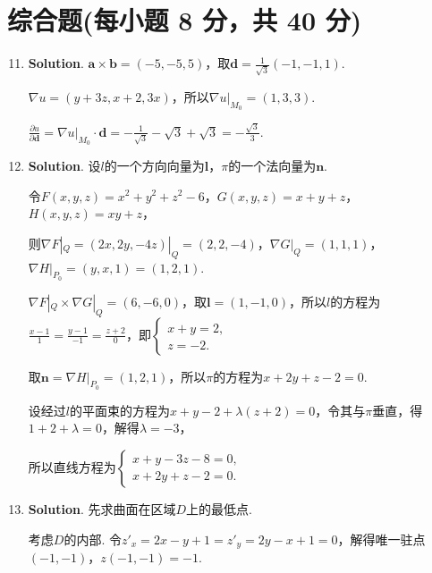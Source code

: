\documentclass[../main.tex]{subfiles}
\begin{document}
\section{综合题(每小题 8 分，共 40 分)}
\begin{enumerate}
    \setcounter{enumi}{10}
    \item \textbf{Solution}. $\boldsymbol{a}\times \boldsymbol{b}= (-5,-5,5)$，取$\boldsymbol
              {d}= \frac{1}{\sqrt{3}}(-1,-1,1)$.

          $\nabla u = (y+3z, x+2, 3x)$，所以$\nabla u|_{M_0}= (1,3,3)$.

          $\frac{\partial u}{\partial \boldsymbol{d}}= \nabla u|_{M_0}\cdot \boldsymbol
              {d}= -\frac{1}{\sqrt{3}}-\sqrt{3}+\sqrt{3}= -\frac{\sqrt{3}}{3}$.

    \item \textbf{Solution}. 设$l$的一个方向向量为$\boldsymbol{l}$，$\pi$的一个法向量为$\boldsymbol
              {n}$.

          令$F(x,y,z)= x^{2}+y^{2}+z^{2}-6$，$G(x,y,z)=x+y+z$，$H(x,y,z)=xy+z$，

          则$\nabla F|_{Q}=(2x,2y,-4z)|_{Q}=(2,2,-4)$，$\nabla G|_{Q}=(1,1,1)$，$\nabla
              H|_{P_0}=(y,x,1)=(1,2,1)$.

          $\nabla F|_{Q}\times \nabla G|_{Q}=(6,-6,0)$，取$\boldsymbol{l}=(1,-1,0)$，所以$l$的方程为$\frac{x-1}{1}
              =\frac{y-1}{-1}=\frac{z+2}{0}$，即$\begin{cases}
                  x+y = 2, \\
                  z = -2.
              \end{cases}$

          取$\boldsymbol{n}=\nabla H|_{P_0}=(1,2,1)$，所以$\pi$的方程为$x+2y+z-2=0$.

          设经过$l$的平面束的方程为$x+y-2+\lambda(z+2)=0$，令其与$\pi$垂直，得$1+2+\lambda
              =0$，解得$\lambda=-3$，

          所以直线方程为$\begin{cases}
                  x+y-3z-8=0, \\
                  x+2y+z-2=0.
              \end{cases}$

    \item \textbf{Solution}. 先求曲面在区域$D$上的最低点.

          考虑$D$的内部. 令$z'_{x} = 2x-y+1 = z'_{y} = 2y-x+1 = 0$，解得唯一驻点$(-1,
              -1)$，$z(-1,-1)=-1$.


\end{enumerate}
\end{document}
